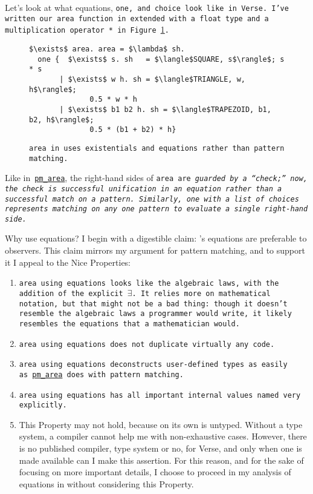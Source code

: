 \documentclass[manuscript,screen,review, 12pt, nonacm]{acmart}
\begin{document}
    Let's look at what equations, \tt{one}, and choice look like in Verse. I've
    written our \tt{area} function in \VC extended with a \tt{float} type and a
    multiplication operator \tt{*} in Figure~\ref{fig:versearea}. 

    \begin{figure}[]
        \verselst
        \begin{lstlisting}[numbers=none]
$\exists$ area. area = $\lambda$ sh. 
  one {  $\exists$ s. sh   = $\langle$SQUARE, s$\rangle$; s * s
       | $\exists$ w h. sh = $\langle$TRIANGLE, w, h$\rangle$; 
              0.5 * w * h
       | $\exists$ b1 b2 h. sh = $\langle$TRAPEZOID, b1, b2, h$\rangle$; 
              0.5 * (b1 + b2) * h}
        \end{lstlisting}
    \caption{\tt{area} in \VC uses existentials and equations rather than
    pattern matching.} 
    \label{fig:versearea}
    \end{figure}

    Like in~\hyperref[fig:pmarea]{\tt{pm\_area}}, the right-hand sides of
    \tt{area} are \it{guarded} by a “check;” now, the check is successful
    unification in an equation rather than a successful match on a pattern.
    Similarly, \tt{one} with a list of choices represents matching on any
    \it{one} pattern to evaluate a single right-hand side. 

    Why use equations? I begin with a digestible claim: \VC's equations are
    preferable to observers. This claim mirrors my argument for pattern
    matching, and to support it I appeal to the Nice Properties: 

    \begin{enumerate}
      \item \tt{area} using equations looks like the algebraic laws, with the
      addition of the explicit $\exists$. It relies more on mathematical
      notation, but that might not be a bad thing: though it doesn't resemble
      the algebraic laws a programmer would write, it likely resembles the
      equations that a mathematician would. 
      \item \tt{area} using equations does not duplicate virtually any code. 
      \item \tt{area} using equations deconstructs user-defined types as easily
      as~\hyperref[fig:pmarea]{\tt{pm\_area}} does with pattern matching. 
      \item \tt{area} using equations has all important internal values named
      very explicitly.
      \item This Property may not hold, because \VC on its own is untyped.
      Without a type system, a compiler cannot help me with non-exhaustive
      cases. However, there is no published compiler, type system or no, for
      Verse, and only when one is made available can I make this assertion. For
      this reason, and for the sake of focusing on more important details, I
      choose to proceed in my analysis of equations in \VC without considering
      this Property. 
    \end{enumerate}
\end{document}
